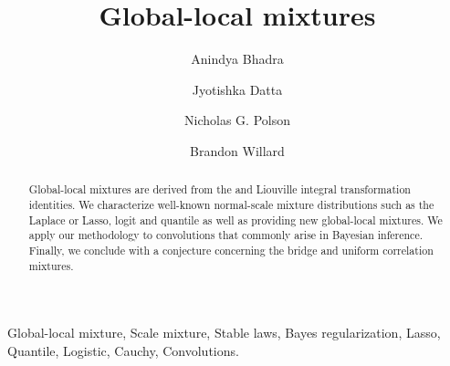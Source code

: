 \documentclass[lineno]{biometrika}
\begin{document}



\title{Global-local mixtures}

\author{Anindya Bhadra}
\author{Jyotishka Datta}
\author{Nicholas G. Polson \and Brandon Willard }


\maketitle
\begin{abstract}
\noindent 
Global-local mixtures are derived from the \CS and Liouville integral transformation identities. We characterize well-known normal-scale mixture distributions such as the Laplace or Lasso, logit and quantile as well as providing new global-local mixtures. We apply our methodology to convolutions that commonly arise in Bayesian inference. Finally, we conclude with a conjecture concerning the bridge and uniform correlation mixtures. 
\end{abstract}

\begin{keywords}
Global-local mixture, Scale mixture, Stable laws, Bayes regularization, Lasso, Quantile, Logistic, Cauchy, Convolutions. 
\end{keywords}
\end{document}
